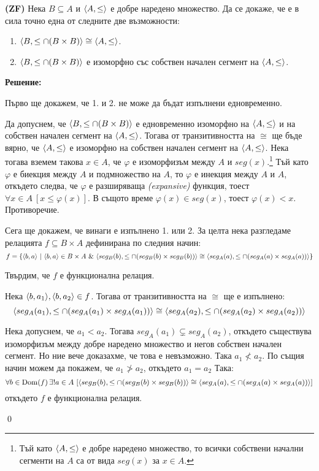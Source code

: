 \begin{problem}
\textbf{(ZF)}
Нека $B \subseteq A$ и $\langle A, \leq \rangle$ е добре наредено множество.
Да се докаже, че е в сила точно една от следните две възможности:
\begin{enumerate}
\item
$\langle B, \leq \cap (B \times B) \rangle \cong \langle A, \leq \rangle$.

\item
$\langle B, \leq \cap (B \times B) \rangle$ е изоморфно със собствен начален сегмент на $\langle A, \leq \rangle$.
\end{enumerate}
\end{problem}

\textbf{Решение:}

\smallbreak
\quad
Първо ще докажем, че 1. и 2. не може да бъдат изпълнени едновременно.

\begin{tcolorbox}[mybox={Доказателство:}]
\quad
Да допуснем, че $\langle B, \leq \cap (B \times B) \rangle$ е едновременно изоморфно на $\langle A, \leq \rangle$
и на собствен начален сегмент на $\langle A, \leq \rangle$.
Тогава от транзитивността на $\cong$ ще бъде вярно, че
$\langle A, \leq \rangle$ е изоморфно на собствен начален сегмент на $\langle A, \leq \rangle$.
Нека тогава вземем такова $x \in A$, че $\varphi$ е изоморфизъм между $A$ и $seg(x)$.\footnote{Тъй като $\langle A, \leq \rangle$
е добре наредено множество, то всички собствени начални сегменти на $A$ са от вида $seg(x)$ за $x \in A$.}
Тъй като $\varphi$ е биекция между $A$ и подмножество на $A$, то
$\varphi$ е инекция между $A$ и $A$, откъдето следва, че $\varphi$ е разширяваща \textit{(expansive)} функция,
тоест $\forall x \in A\ [x \leq \varphi(x)]$. В същото време $\varphi(x) \in seg(x)$, тоест $\varphi(x) < x$. Противоречие.
\end{tcolorbox}

\quad
Сега ще докажем, че винаги е изпълнено 1. или 2.
За целта нека разгледаме релацията $f \subseteq B \times A$ дефинирана по следния начин:
\[
f = \{\langle b, a \rangle\ |\ \langle b, a \rangle \in B \times A \ \&\ 
                      \langle seg_B(b), \leq \cap (seg_B(b) \times seg_B(b)) \rangle \cong \langle seg_A(a), \leq \cap (seg_A(a) \times seg_A(a)) \rangle\}
\]

\quad
Твърдим, че $f$ е функционална релация.
\begin{tcolorbox}[mybox={Доказателство:}]
\quad
Нека $\langle b, a_1 \rangle, \langle b, a_2 \rangle \in f$.
Тогава от транзитивността на $\cong$ ще е изпълнено:
\[\langle seg_A(a_1), \leq \cap (seg_A(a_1) \times seg_A(a_1)) \rangle \cong \langle seg_A(a_2), \leq \cap (seg_A(a_2) \times seg_A(a_2)) \rangle\]

\quad
Нека допуснем, че $a_1 < a_2$.
Тогава $seg_A(a_1) \subsetneq seg_A(a_2)$, откъдето съществува изоморфизъм
между добре наредено множество и негов собствен начален сегмент.
Но ние вече доказахме, че това е невъзможно.
Така $a_1 \not < a_2$.
По същия начин можем да покажем, че $a_1 \not > a_2$, откъдето $a_1 = a_2$
Така:
\[
\forall b \in \operatorname{Dom}(f) \, \exists! a \in A
\ [
\langle seg_B(b), \leq \cap (seg_B(b) \times seg_B(b)) \rangle \cong \langle seg_A(a), \leq \cap (seg_A(a) \times seg_A(a)) \rangle
]
\]
\quad
откъдето $f$ е функционална релация.

\qed
\end{tcolorbox}

